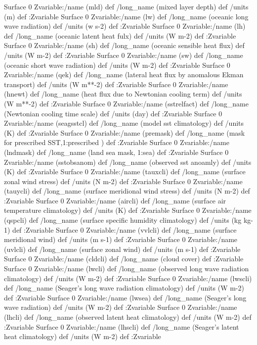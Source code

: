{\begin{ingrid}
Surface 0 Zvariable:/name (mld) def /long_name (mixed layer depth) def /units (m) def :Zvariable
Surface 0 Zvariable:/name (lw) def /long_name (oceanic long wave radiation) def /units (w s-2) def :Zvariable
Surface 0 Zvariable:/name (lh) def /long_name (oceanic latent heat fulx)  def /units (W m-2) def :Zvariable
Surface 0 Zvariable:/name (sh) def /long_name (oceanic sensible heat flux)  def /units (W m-2) def :Zvariable
Surface 0 Zvariable:/name (sw) def /long_name (oceanic short wave radiation)  def /units (W m-2) def :Zvariable
Surface 0 Zvariable:/name (qek) def /long_name (lateral heat flux by anomalous Ekman transport) def /units (W m**-2) def :Zvariable
Surface 0 Zvariable:/name (hnewt) def /long_name (heat flux due to Newtonian cooling term) def /units (W m**-2) def :Zvariable
Surface 0 Zvariable:/name (sstrelfact) def /long_name (Newtonian cooling time scale) def /units (day) def :Zvariable
Surface 0 Zvariable:/name (seagsstcl) def /long_name (model sst climatology) def /units (K) def :Zvariable
Surface 0 Zvariable:/name (premask) def /long_name (mask for prescribed SST,1:prescribed ) def :Zvariable
Surface 0 Zvariable:/name (lndmask) def /long_name (land sea mask, 1:sea) def :Zvariable
Surface 0 Zvariable:/name (sstobsanom) def /long_name (observed sst anoamly) def /units (K) def :Zvariable
Surface 0 Zvariable:/name (tauxcli) def /long_name (surface zonal wind stress) def /units (N m-2) def :Zvariable
Surface 0 Zvariable:/name (tauycli) def /long_name (surface meridional wind stress) def /units (N m-2) def :Zvariable
Surface 0 Zvariable:/name (aircli) def /long_name (surface air temperature climatology) def /units (K) def :Zvariable
Surface 0 Zvariable:/name (qspcli) def /long_name (surface specific humidity climatology) def /units (kg kg-1) def  :Zvariable
Surface 0 Zvariable:/name (vvlcli) def /long_name (surface meridional wind) def /units (m s-1) def :Zvariable
Surface 0 Zvariable:/name (uvlcli) def /long_name (surface zonal wind) def /units (m s-1) def :Zvariable
Surface 0 Zvariable:/name (cldcli) def /long_name (cloud cover) def :Zvariable
Surface 0 Zvariable:/name (lwcli) def /long_name (observed long wave radiation climatology) def /units (W m-2) def :Zvariable
Surface 0 Zvariable:/name (lwscli) def /long_name (Seager's long wave radiation climatology) def /units (W m-2) def :Zvariable
Surface 0 Zvariable:/name (lwsea) def /long_name (Seager's long wave radiation) def /units (W m-2) def :Zvariable
Surface 0 Zvariable:/name (lhcli) def /long_name (observed latent heat climatology) def /units (W m-2) def :Zvariable
Surface 0 Zvariable:/name (lhscli) def /long_name (Seager's latent heat climatology) def /units (W m-2) def :Zvariable

\end{ingrid}}
